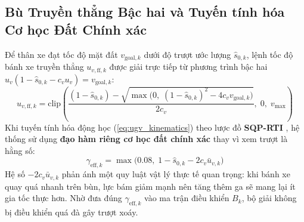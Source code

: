 \documentclass[12pt, a4paper]{article}
\begin{document}
\subsection{Bù Truyền thẳng Bậc hai và Tuyến tính hóa Cơ học Đất Chính xác}
Để thân xe đạt tốc độ mặt đất $v_{\text{goal},k}$ dưới độ trượt ước lượng $\hat{s}_{0,k}$, lệnh tốc độ bánh xe truyền thẳng $u_{v,\text{ff},k}$ được giải trực tiếp từ phương trình bậc hai $u_v(1 - \hat{s}_{0,k} - c_v u_v) = v_{\text{goal},k}$:
\begin{equation}
    u_{v,\text{ff},k} = \text{clip}\!\left( \frac{(1 - \hat{s}_{0,k}) - \sqrt{\max\!\big(0,\; (1 - \hat{s}_{0,k})^2 - 4 c_v v_{\text{goal},k}\big)}}{2 c_v},\; 0,\; v_{\max} \right)
    \label{eq:quad_ff}
\end{equation}
Khi tuyến tính hóa động học (\ref{eq:ugv_kinematics}) theo lược đồ \textbf{SQP-RTI} \cite{diehl2005}, hệ thống sử dụng \textbf{đạo hàm riêng cơ học đất chính xác} thay vì xem trượt là hằng số:
\begin{equation}
    \gamma_{\text{eff},k} = \max\!\big(0.08,\; 1 - \hat{s}_{0,k} - 2 c_v \bar{u}_{v,k}\big)
    \label{eq:gamma_eff}
\end{equation}
Hệ số $-2 c_v \bar{u}_{v,k}$ phản ánh một quy luật vật lý thực tế quan trọng: khi bánh xe quay quá nhanh trên bùn, lực bám giảm mạnh nên tăng thêm ga sẽ mang lại ít gia tốc thực hơn. Nhờ đưa đúng $\gamma_{\text{eff},k}$ vào ma trận điều khiển $B_k$, bộ giải không bị điều khiển quá đà gây trượt xoáy.
\end{document}
